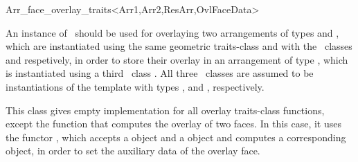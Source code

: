 
\ccRefPageBegin

\begin{ccRefClass}{Arr_face_overlay_traits<Arr1,Arr2,ResArr,OvlFaceData>}

\ccDefinition

An instance of \ccRefName\ should be used for overlaying two arrangements
of types  and , which are instantiated using the same
geometric traits-class and with the \dcel\ classes  and 
respetively, in order to store their overlay in an arrangement of type
, which is instantiated using a third \dcel\ class .
All three \dcel\ classes are assumed to be instantiations of the
 template with types ,
 and , respectively.

This class gives empty implementation for all overlay traits-class functions,
except the function that computes the overlay of two faces. In this case,
it uses the functor , which accepts a  object
and a  object and computes a corresponding 
object, in order to set the auxiliary data of the overlay face.


\ccIsModel

\ccSeeAlso

\end{ccRefClass}

\ccRefPageEnd
